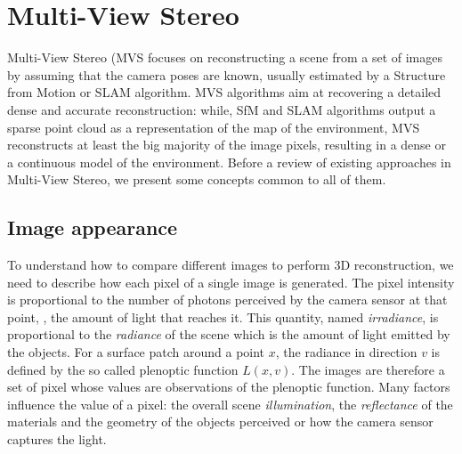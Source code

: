 \section{Multi-View Stereo}

 Multi-View Stereo (MVS focuses on reconstructing a scene from a set of images by assuming that the camera poses are known, usually estimated by a Structure from Motion or SLAM algorithm.
MVS algorithms aim at recovering a detailed dense and accurate reconstruction: while, SfM and SLAM algorithms output a sparse point cloud as a representation of the map of the environment, MVS reconstructs at least the big majority of the image pixels, resulting in a dense or a continuous model of the environment.
Before a review of existing approaches  in Multi-View Stereo, we present some concepts common to all of them.

\subsection{Image appearance}
To understand how to compare different images to perform 3D reconstruction, we need to describe how each pixel of a single image is generated. 
The pixel intensity is proportional to the number of photons perceived by the camera sensor at that point, \ie, the amount of light that reaches it. This quantity, named \emph{irradiance}, is proportional to the \emph{radiance} of the scene which is the amount of light emitted by the objects.
For a surface patch around a point $x$, the radiance in direction $v$ is defined by the so called plenoptic function $L(x,v)$. 
The images are therefore a set of pixel whose values are observations of the plenoptic function.
Many factors influence the value of a pixel: the overall scene \emph{illumination}, the \emph{reflectance} of the materials and the geometry of the objects perceived or how the camera sensor captures the light.

